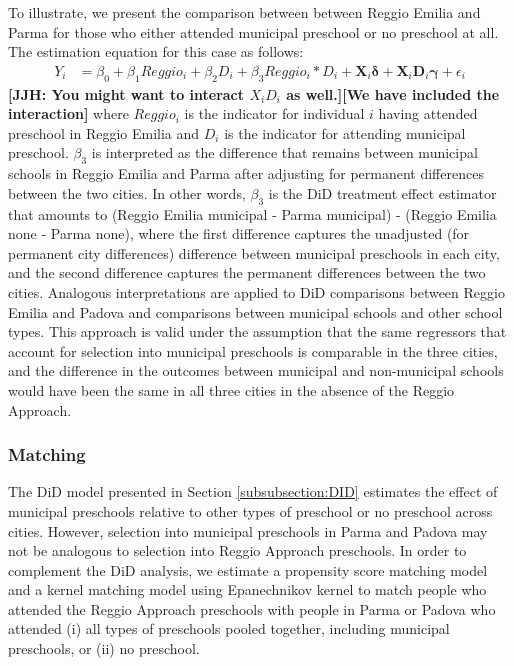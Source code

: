 To illustrate, we present the comparison between between Reggio Emilia and Parma for those who either attended municipal preschool or no preschool at all. The estimation equation for this case as follows:
\begin{eqnarray}  \label{eq:specific2}
Y_i & = \beta_0 + \beta_1 Reggio_i + \beta_2 D_i + \beta_3 Reggio_i * D_i + \bm{X}_i \bm{\delta} + \bm{X}_i \bm{D}_i \bm{\gamma} + \epsilon_i
\end{eqnarray}
\noindent \textbf{[JJH: You might want to interact $X_i D_i$ as well.][We have included the interaction]} where $Reggio_i$ is the indicator for individual $i$ having attended preschool in Reggio Emilia and $D_i$ is the indicator for attending municipal preschool. $\beta_3$ is interpreted as the difference that remains between municipal schools in Reggio Emilia and Parma after adjusting for permanent differences between the two cities. In other words, $\beta_3$ is the DiD treatment effect estimator that amounts to (Reggio Emilia municipal - Parma municipal) - (Reggio Emilia none - Parma none), where the first difference captures the unadjusted (for permanent city differences) difference between municipal preschools in each city, and the second difference captures the permanent differences between the two cities. Analogous interpretations are applied to DiD comparisons between Reggio Emilia and Padova and comparisons between municipal schools and other school types. This approach is valid under the assumption that the same regressors that account for selection into municipal preschools is comparable in the three cities, and the difference in the outcomes between municipal and non-municipal schools would have been the same in all three cities in the absence of the Reggio Approach.

\subsubsection{Matching}

The DiD model presented in Section \ref{subsubsection:DID} estimates the effect of municipal preschools relative to other types of preschool or no preschool across cities. However, selection into municipal preschools in Parma and Padova may not be analogous to selection into Reggio Approach preschools. In order to complement the DiD analysis, we estimate a propensity score matching model and a kernel matching model using Epanechnikov kernel to match people who attended the Reggio Approach preschools with people in Parma or Padova who attended (i) all types of preschools pooled together, including municipal preschools, or (ii) no preschool.

